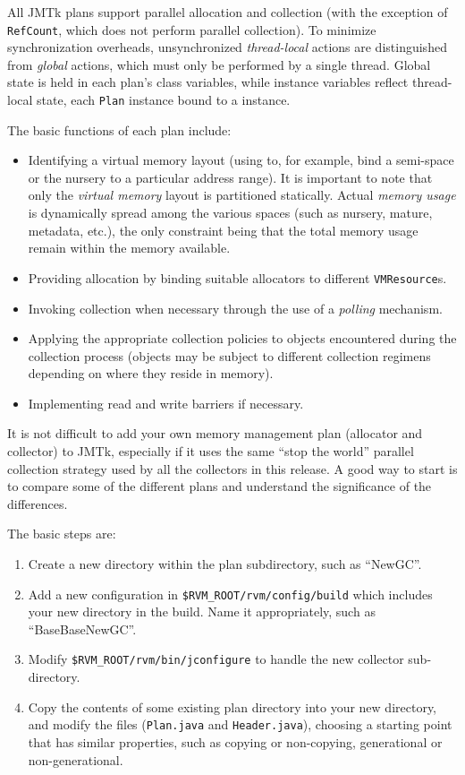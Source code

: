 All JMTk plans support parallel allocation and collection (with the
exception of \texttt{RefCount}, which does not perform parallel
collection).  To minimize synchronization overheads, unsynchronized
\emph{thread-local} actions are distinguished from \emph{global}
actions, which must only be performed by a single thread.  Global
state is held in each plan's class variables, while instance variables
reflect thread-local state, each \texttt{Plan} instance bound to a
 instance.

The basic functions of each plan include:
\begin{itemize}
\item Identifying a virtual memory layout (using
   to, for example, bind a
  semi-space or the nursery to a particular address range).  It is
  important to note that only the \emph{virtual memory} layout is
  partitioned statically.  Actual \emph{memory usage} is dynamically
  spread among the various spaces (such as nursery, mature, metadata,
  etc.), the only constraint being that the total memory usage remain
  within the memory available.
\item Providing allocation by binding suitable allocators to different
  \texttt{VMResource}s.
\item Invoking collection when necessary through the use of a
  \emph{polling} mechanism.
\item Applying the appropriate collection policies to objects
  encountered during the collection process (objects may be subject to
  different collection regimens depending on where they reside in
  memory).
\item Implementing read and write barriers if necessary.
\end{itemize}

It is not difficult to add your own memory management plan (allocator
and collector) to JMTk, especially if it uses the same ``stop the
world'' parallel collection strategy used by all the collectors in
this release.  A good way to start is to compare some of the different
plans and understand the significance of the differences.

The basic steps are:

\begin{enumerate}
\item Create a new directory within the plan subdirectory, such as
  ``NewGC''.
\item Add a new configuration in \texttt{\$RVM\_ROOT/rvm/config/build}
  which includes your new directory in the build.  Name it
  appropriately, such as ``BaseBaseNewGC''.
\item Modify \texttt{\$RVM\_ROOT/rvm/bin/jconfigure} to handle the new
  collector sub-directory.
\item Copy the contents of some existing plan directory into your new
  directory, and modify the files (\texttt{Plan.java} and
  \texttt{Header.java}), choosing a starting point that has similar
  properties, such as copying or non-copying, generational or
  non-generational.
\end{enumerate}

